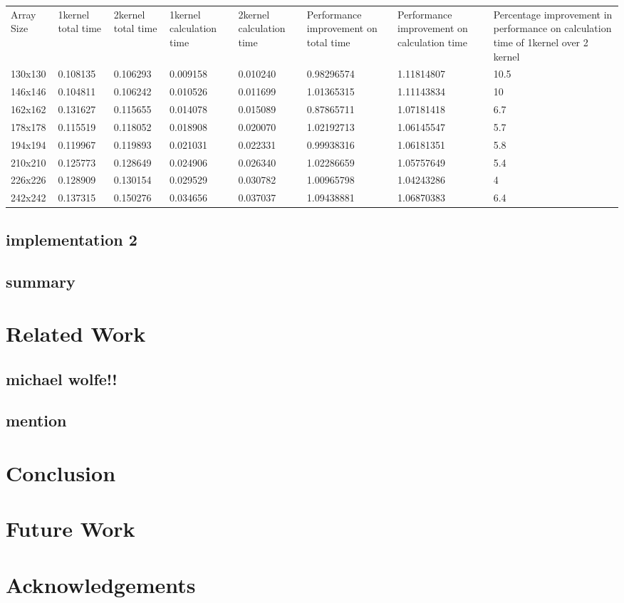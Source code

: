 \documentclass[11pt, twocolumn]{article}
\begin{document}
    \begin{tabular}{ l l l l l l l l }
    Array Size  & 1kernel total time   & 2kernel  total time  & 1kernel calculation time    & 2kernel  calculation time   & Performance improvement on total time   & Performance improvement on calculation time & Percentage improvement in performance on calculation time of 1kernel over 2 kernel \\
    130x130 & 0.108135    & 0.106293    & 0.009158    & 0.010240    & 0.98296574  & 1.11814807  & 10.5  \\
    146x146 & 0.104811    & 0.106242    & 0.010526    & 0.011699    & 1.01365315  & 1.11143834  & 10    \\
    162x162 & 0.131627    & 0.115655    & 0.014078    & 0.015089    & 0.87865711  & 1.07181418  & 6.7   \\
    178x178 & 0.115519    & 0.118052    & 0.018908    & 0.020070    & 1.02192713  & 1.06145547  & 5.7   \\
    194x194 & 0.119967    & 0.119893    & 0.021031    & 0.022331    & 0.99938316  & 1.06181351  & 5.8   \\
    210x210 & 0.125773    & 0.128649    & 0.024906    & 0.026340    & 1.02286659  & 1.05757649  & 5.4   \\
    226x226 & 0.128909    & 0.130154    & 0.029529    & 0.030782    & 1.00965798  & 1.04243286  & 4     \\
    242x242 & 0.137315    & 0.150276    & 0.034656    & 0.037037    & 1.09438881  & 1.06870383  & 6.4   \\
    \end{tabular}

    \subsection{implementation 2}
    \subsection{summary} %

\section{Related Work} %
    \subsection{michael wolfe!!}
    \subsection{mention} %

\section{Conclusion} %

\section{Future Work} %
\section{Acknowledgements} %
\end{document}
